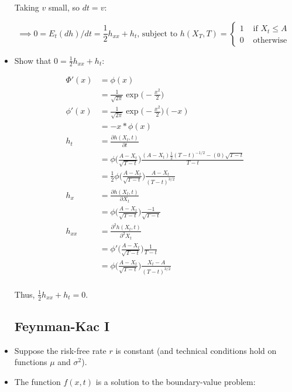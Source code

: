 \documentclass{article}
\begin{document}
\begin{itemize}
Taking $v$ small, so $dt = v$:

$$
\implies 0 = E_t(dh)/dt = \frac{1}{2} h_{xx} + h_t \text{, subject to } h(X_T, T) = \begin{cases} 1 &\text{ if } X_t \le A \\ 0 & \text{ otherwise }\end{cases}
$$

\item Show that $0 = \frac{1}{2} h_{xx} + h_t$:

\begin{align*}
\Phi'(x) &= \phi(x) \\
&= \frac{1}{\sqrt{2\pi}} \exp \Bigg(- \frac{x^2}{2}\Bigg)\\
\phi'(x) 
&= \frac{1}{\sqrt{2\pi}} \exp \Bigg(- \frac{x^2}{2}\Bigg) (-x)\\
&= -x*\phi(x)\\
h_t 
&= \frac{\partial h(X_t, t)}{\partial t} \\
&= \phi\Bigg(\frac{A - X_t}{\sqrt{T-t}}\Bigg) \frac{(A - X_t)\frac{1}{2}(T-t)^{-1/2} - (0)\sqrt{T -t}}{T - t} \\
&= \frac{1}{2}\phi\Bigg(\frac{A - X_t}{\sqrt{T-t}}\Bigg) \frac{A-X_t}{(T - t)^{3/2}} \\
h_x 
&= \frac{\partial h(X_t, t)}{\partial X_t} \\
&= \phi\Bigg(\frac{A - X_t}{\sqrt{T-t}}\Bigg) \frac{-1}{\sqrt{T - t}} \\
h_{xx} 
&= \frac{\partial^2 h(X_t, t)}{\partial^2 X_t} \\
&= \phi'\Bigg(\frac{A - X_t}{\sqrt{T-t}}\Bigg) \frac{1}{T - t} \\
&= \phi\Bigg(\frac{A - X_t}{\sqrt{T-t}}\Bigg) \frac{X_t-A}{(T-t)^{3/2}} \\
\end{align*}

Thus, $\frac{1}{2} h_{xx} + h_t = 0$.

\pagebreak

\subsection*{Feynman-Kac I}

\item Suppose the risk-free rate $r$ is constant (and technical conditions hold on functions $\mu$ and $\sigma^2$).

\item The function $f(x, t)$ is a solution to the boundary-value problem:


\end{itemize}
\end{document}
